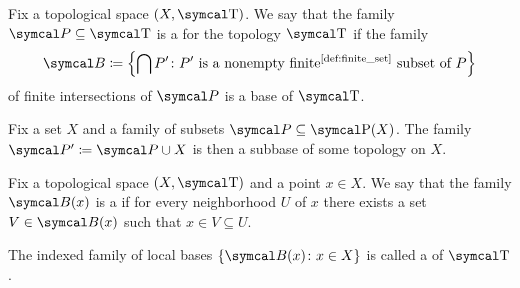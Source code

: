 \begin{definition}\label{def:topological_subbase}\cite[12]{Engelking1989}
  Fix a topological space \( (X, \CT) \). We say that the family \( \Cal{P} \subseteq \CT \) is a  for the topology \( \CT \) if the family
  \begin{equation*}
    \Cal{B} \coloneqq \left\{ \bigcap P' \colon P' \text{ is a nonempty finite\Tinyref{def:finite_set} subset of } P \right\}
  \end{equation*}
  of finite intersections of \( \Cal{P} \) is a base of \( \CT \).
\end{definition}

\begin{proposition}\label{thm:subbase_from_arbitrary_family}
  Fix a set \( X \) and a family of subsets \( \Cal{P} \subseteq \Power(X) \). The family \( \Cal{P}' \coloneqq \Cal{P} \cup X \) is then a subbase of some topology on \( X \).
\end{proposition}

\begin{definition}\label{def:topological_local_base}\cite[12]{Engelking1989}
  Fix a topological space \( (X, \CT) \) and a point \( x \in X \). We say that the family \( \Cal{B}(x) \) is a  if for every neighborhood \( U \) of \( x \) there exists a set \( V \in \Cal{B}(x) \) such that \( x \in V \subseteq U \).

  The indexed family of local bases \( \{ \Cal{B}(x) \colon x \in X \} \) is called a  of \( \CT \).
\end{definition}

